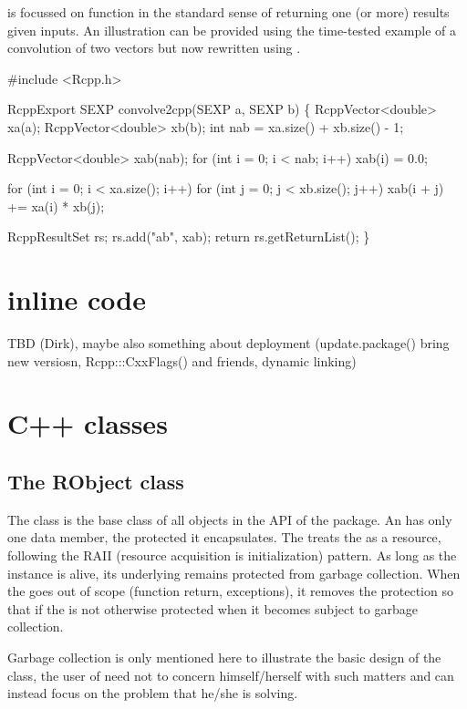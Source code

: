  is focussed on function in the standard sense of returning one (or
more) results given inputs. An illustration can be provided using the
time-tested example of a convolution of two vectors \citep{R:exts} but now
rewritten using .

\begin{example}
#include <Rcpp.h>

RcppExport SEXP convolve2cpp(SEXP a, SEXP b) \{
  RcppVector<double> xa(a);
  RcppVector<double> xb(b);
  int nab = xa.size() + xb.size() - 1;

  RcppVector<double> xab(nab);
  for (int i = 0; i < nab; i++) xab(i) = 0.0;

  for (int i = 0; i < xa.size(); i++)
    for (int j = 0; j < xb.size(); j++) 
       xab(i + j) += xa(i) * xb(j);

  RcppResultSet rs;
  rs.add("ab", xab);
  return rs.getReturnList();
\}
\end{example}

\section{inline code}

TBD (Dirk), maybe also something about deployment (update.package() bring new
versiosn, Rcpp:::CxxFlags() and friends, dynamic linking)

\section{ C++ classes}

\subsection{The RObject class}

The  class is the base class of all objects in the 
API of the  package. An  has only one 
data member, the protected  it encapsulates. 
The  treats the  as a resource, following the
RAII (resource acquisition is initialization) pattern. As long as the 
 instance is alive, its underlying  remains 
protected from garbage collection. When the  goes out 
of scope (function return, exceptions), it removes the protection so that 
if the  is not otherwise protected when it becomes subject to 
garbage collection. 

Garbage collection is only mentioned here to illustrate the basic design
of the  class, the user of  need not to concern 
himself/herself with such matters and can instead focus on the problem
that he/she is solving.

